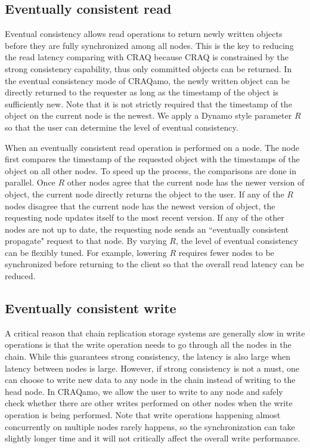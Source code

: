 \subsection{Eventually consistent read}
Eventual consistency allows read operations to return newly written objects before they are fully synchronized among all nodes. This is the key to reducing the read latency comparing with CRAQ because CRAQ is constrained by the strong consistency capability, thus only committed objects can be returned. In the eventual consistency mode of CRAQamo, the newly written object can be directly returned to the requester as long as the timestamp of the object is sufficiently new. Note that it is not strictly required that the timestamp of the object on the current node is the newest. We apply a Dynamo style parameter $R$ so that the user can determine the level of eventual consistency.

When an eventually consistent read operation is performed on a node. The node first compares the timestamp of the requested object with the timestamps of the object on all other nodes. To speed up the process, the comparisons are done in parallel. Once $R$ other nodes agree that the current node has the newer version of object, the current node directly returns the object to the user. If any of the $R$ nodes disagree that the current node has the newest version of object, the requesting node updates itself to the most recent version. If any of the other nodes are not up to date, the requesting node sends an ``eventually consistent propagate" request to that node.  By varying $R$, the level of eventual consistency can be flexibly tuned. For example, lowering $R$ requires fewer nodes to be synchronized before returning to the client so that the overall read latency can be reduced.

\subsection{Eventually consistent write}
A critical reason that chain replication storage systems are generally slow in write operations is that the write operation needs to go through all the nodes in the chain. While this guarantees strong consistency, the latency is also large when latency between nodes is large. However, if strong consistency is not a must, one can choose to write new data to any node in the chain instead of writing to the head node. In CRAQamo, we allow the user to write to any node and safely check whether there are other writes performed on other nodes when the write operation is being performed. Note that write operations happening almost concurrently on multiple nodes rarely happens, so the synchronization can take slightly longer time and it will not critically affect the overall write performance.

